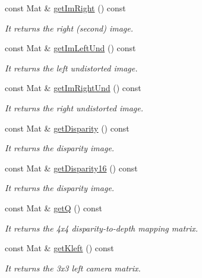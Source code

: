 \begin{DoxyCompactItemize}
const Mat \& \mbox{\hyperlink{classStereoCamera_ac7930aa4fa0681246e74c08cf4b1079b}{get\+Im\+Right}} () const
\begin{DoxyCompactList}\small\item\em It returns the right (second) image. \end{DoxyCompactList}\item 
const Mat \& \mbox{\hyperlink{classStereoCamera_a52ba4f0331f3690ca0f983b10bd0c783}{get\+Im\+Left\+Und}} () const
\begin{DoxyCompactList}\small\item\em It returns the left undistorted image. \end{DoxyCompactList}\item 
const Mat \& \mbox{\hyperlink{classStereoCamera_a19009c20003a5c7e957a4b3c34913fe9}{get\+Im\+Right\+Und}} () const
\begin{DoxyCompactList}\small\item\em It returns the right undistorted image. \end{DoxyCompactList}\item 
const Mat \& \mbox{\hyperlink{classStereoCamera_a74adec3c305b13df4757e105cd72a7db}{get\+Disparity}} () const
\begin{DoxyCompactList}\small\item\em It returns the disparity image. \end{DoxyCompactList}\item 
const Mat \& \mbox{\hyperlink{classStereoCamera_a4a6e408446750224499ed9ecdc51629e}{get\+Disparity16}} () const
\begin{DoxyCompactList}\small\item\em It returns the disparity image. \end{DoxyCompactList}\item 
const Mat \& \mbox{\hyperlink{classStereoCamera_a9f10e66261a0211e5d786abc3df8a70b}{getQ}} () const
\begin{DoxyCompactList}\small\item\em It returns the 4x4 disparity-\/to-\/depth mapping matrix. \end{DoxyCompactList}\item 
const Mat \& \mbox{\hyperlink{classStereoCamera_a932e0ebd63c3e9a93b33c1846459aadc}{get\+Kleft}} () const
\begin{DoxyCompactList}\small\item\em It returns the 3x3 left camera matrix. \end{DoxyCompactList}\item 

\end{DoxyCompactItemize}
